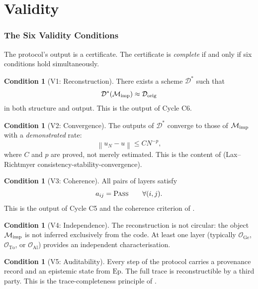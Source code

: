 \documentclass[11pt,a4paper]{article}
\theoremstyle{definition}
\newtheorem{condition}[definition]{Condition}
\theoremstyle{plain}
\newcommand{\Ge}{\mathrm{Ge}}
\newcommand{\To}{\mathrm{To}}
\newcommand{\Al}{\mathrm{Al}}
\newcommand{\Mcal}{\mathcal{M}}
\newcommand{\Dcal}{\mathcal{D}}
\newcommand{\Ocal}{\mathcal{O}}
\newcommand{\Norm}[1]{\left\lVert #1 \right\rVert}
\newcommand{\STPASS}{\textsc{Pass}}
\begin{document}
\part{Validity}
\label{part:validity}

\section{The Six Validity Conditions}
\label{sec:validity}

The protocol's output is a certificate. The certificate is
\emph{complete} if and only if six conditions hold simultaneously.

\begin{condition}[V1: Reconstruction]\label{cond:v1}
There exists a scheme $\Dcal^\ast$ such that
\[
  \Dcal^\ast(\Mcal_{\rm imp}) \approx \Dcal_{\rm orig}
\]
in both structure and output. This is the output of Cycle C6.
\end{condition}

\begin{condition}[V2: Convergence]\label{cond:v2}
The outputs of $\Dcal^\ast$ converge to those of
$\Mcal_{\rm imp}$ with a \emph{demonstrated} rate:
\[
  \Norm{u_N - u} \leq C N^{-p},
\]
where $C$ and $p$ are proved, not merely estimated. This is the
content of \cite[Theorem 4.6]{paperI} (Lax--Richtmyer
consistency-stability-convergence).
\end{condition}

\begin{condition}[V3: Coherence]\label{cond:v3}
All pairs of layers satisfy
\[
  a_{ij} = \STPASS \qquad \forall (i,j).
\]
This is the output of Cycle C5 and the coherence criterion of
\cite[Definition 4.1]{paperII}.
\end{condition}

\begin{condition}[V4: Independence]\label{cond:v4}
The reconstruction is not circular: the object $\Mcal_{\rm imp}$
is not inferred exclusively from the code. At least one layer
(typically $\Ocal_\Ge$, $\Ocal_\To$, or $\Ocal_\Al$) provides an
independent characterisation.
\end{condition}

\begin{condition}[V5: Auditability]\label{cond:v5}
Every step of the protocol carries a provenance record and an
epistemic state from $\mathrm{Ep}$. The full trace is
reconstructible by a third party. This is the trace-completeness
principle of \cite[Principle 6.4]{paperIII}.
\end{condition}
\end{document}
